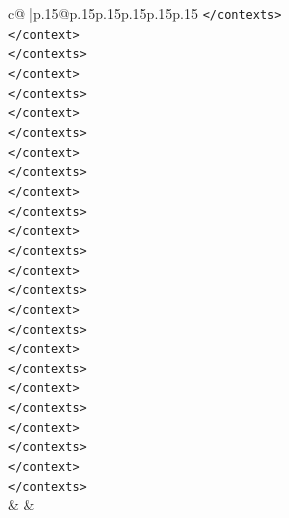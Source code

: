 \documentclass{article}
\begin{document}
{\begin{supertabular}{c@{$\;$}|p{.15\linewidth}@{}p{.15\linewidth}p{.15\linewidth}p{.15\linewidth}p{.15\linewidth}p{.15\linewidth}}
{{{\texttt{</contexts>} \\
\texttt{</context>} \\
\texttt{</contexts>} \\
\texttt{</context>} \\
\texttt{</contexts>} \\
\texttt{</context>} \\
\texttt{</contexts>} \\
\texttt{</context>} \\
\texttt{</contexts>} \\
\texttt{</context>} \\
\texttt{</contexts>} \\
\texttt{</context>} \\
\texttt{</contexts>} \\
\texttt{</context>} \\
\texttt{</contexts>} \\
\texttt{</context>} \\
\texttt{</contexts>} \\
\texttt{</context>} \\
\texttt{</contexts>} \\
\texttt{</context>} \\
\texttt{</contexts>} \\
\texttt{</context>} \\
\texttt{</contexts>} \\
\texttt{</context>} \\
\texttt{</contexts>} \\
            }
        }
    }
    & & \\ \\


\end{supertabular}}
\end{document}
